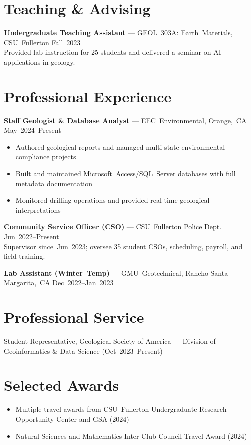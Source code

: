 \documentclass[margin]{res}
\begin{document}
\section{Teaching \& Advising}
\textbf{Undergraduate Teaching Assistant} — GEOL 303A: Earth Materials, CSU Fullerton \hfill Fall 2023\\
Provided lab instruction for 25 students and delivered a seminar on AI applications in geology.

\section{Professional Experience}
\textbf{Staff Geologist \& Database Analyst} — EEC Environmental, Orange, CA \hfill May 2024–Present
\begin{itemize}[leftmargin=*, noitemsep]
  \item Authored geological reports and managed multi‑state environmental compliance projects
  \item Built and maintained Microsoft Access/SQL Server databases with full metadata documentation
  \item Monitored drilling operations and provided real‑time geological interpretations
\end{itemize}

\textbf{Community Service Officer (CSO)} — CSU Fullerton Police Dept. \hfill Jun 2022–Present\\
Supervisor since Jun 2023; oversee 35 student CSOs, scheduling, payroll, and field training.

\textbf{Lab Assistant (Winter Temp)} — GMU Geotechnical, Rancho Santa Margarita, CA \hfill Dec 2022–Jan 2023

\section{Professional Service}
Student Representative, Geological Society of America — Division of Geoinformatics \& Data Science (Oct 2023–Present)

\section{Selected Awards}
\begin{itemize}[noitemsep]
  \item Multiple travel awards from CSU Fullerton Undergraduate Research Opportunity Center and GSA (2024)
  \item Natural Sciences and Mathematics Inter‑Club Council Travel Award (2024)
\end{itemize}
\end{document}
